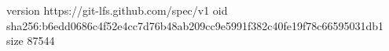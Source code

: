version https://git-lfs.github.com/spec/v1
oid sha256:b6edd0686c4f52e4cc7d76b48ab209cc9e5991f382c40fe19f78c66595031db1
size 87544
